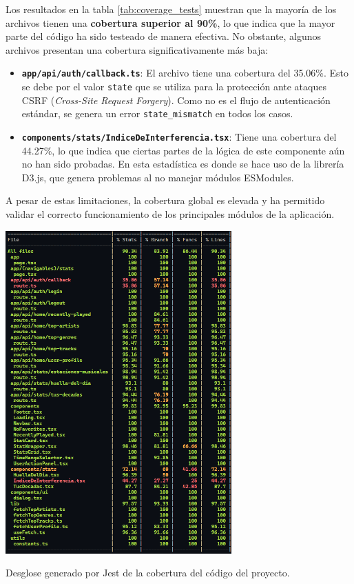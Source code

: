 Los resultados en la tabla \ref{tab:coverage_tests} muestran que la mayoría de los archivos tienen una \textbf{cobertura superior al 90\%}, lo que indica que la mayor parte del código ha sido testeado de manera efectiva. No obstante, algunos archivos presentan una cobertura significativamente más baja:

\begin{itemize}
    \item \textbf{\texttt{app/api/auth/callback.ts}}: El archivo tiene una cobertura del 35.06\%. Esto se debe por el valor \texttt{state} que se utiliza para la protección ante ataques CSRF (\textit{Cross-Site Request Forgery}). Como no es el flujo de autenticación estándar, se genera un error \texttt{state\_mismatch} en todos los casos.
    \item \textbf{\texttt{components/stats/IndiceDeInterferencia.tsx}}:  Tiene una cobertura del 44.27\%, lo que indica que ciertas partes de la lógica de este componente aún no han sido probadas. En esta estadística es donde se hace uso de la librería D3.js, que genera problemas al no manejar módulos ESModules.
\end{itemize}

A pesar de estas limitaciones, la cobertura global es elevada y ha permitido validar el correcto funcionamiento de los principales módulos de la aplicación.

\begin{table}[htbp]
    \centering
    \includegraphics[width=0.65\textwidth]{figures/coverage_tests.png}
    \captionsetup{skip=7pt}
    \caption{Desglose generado por Jest de la cobertura del código del proyecto.}
    \label{tab:coverage_tests}
\end{table}


